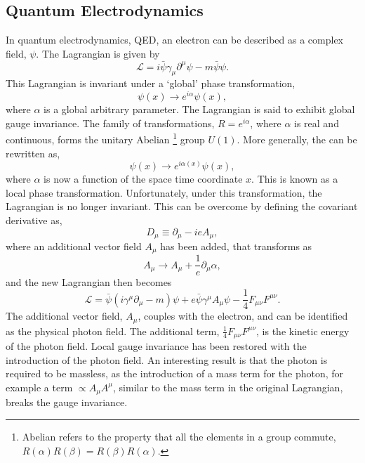 \subsection{Quantum Electrodynamics}
\label{sec:QED}
In quantum electrodynamics, QED, an electron can be described as a complex
field, $\psi$. The Lagrangian is given by
\begin{equation}
\mathcal{L} = i \bar{\psi} \gamma_{\mu} \partial^{\mu} \psi - m \bar{\psi}\psi .
\end{equation}
This Lagrangian is invariant under a `global' phase transformation,
\begin{equation}
\psi(x) \to e^{i\alpha} \psi(x),
\label{eq:global}
\end{equation}
where $\alpha$ is a global arbitrary parameter. The Lagrangian is said to exhibit
global gauge invariance. The family of transformations, $R =
e^{i \alpha}$, where $\alpha$ is real and continuous, forms the unitary
Abelian \footnote{Abelian refers to the property that all the elements in a
group commute, $R(\alpha)R(\beta) = R(\beta)R(\alpha)$.}
group $U(1)$. 
More generally, the  can be rewritten as,
\begin{equation}
\psi(x) \to e^{i\alpha(x)} \psi(x),
\label{eq:local}
\end{equation}
where $\alpha$ is now a function of the space time coordinate $x$. This is known
as a local phase transformation. Unfortunately, under this transformation, the
Lagrangian is no longer invariant. This can be overcome by defining the
covariant derivative as,
\begin{equation}
D_{\mu} \equiv \partial_{\mu} - i e A_{\mu},
\end{equation}
where an additional vector field $A_{\mu}$ has been added, that transforms as 
\begin{equation}
A_{\mu} \to A_{\mu} + \frac{1}{e} \partial_{\mu} \alpha,
\end{equation}
and the new Lagrangian then becomes
\begin{equation}
\mathcal{L} = 
\bar{\psi}(i\gamma^{\mu}\partial_{\mu} - m)\psi + 
e \bar{\psi} \gamma^{\mu} A_{\mu} \psi - 
\frac{1}{4} F_{\mu\nu} F^{\mu\nu}. 
\end{equation}
The additional vector field, $A_{\mu}$, couples with the electron,
 and can be identified as the physical photon field. The additional
term, $\frac{1}{4} F_{\mu\nu} F^{\mu\nu}$, is the kinetic energy of the photon
field. Local gauge invariance has been restored with the introduction of the photon
field. An interesting result is that the photon is required to be massless, as the introduction of
a mass term for the photon, for example a term $\propto A_{\mu}A^{\mu}$,
similar to the mass term in the original Lagrangian, breaks
the gauge invariance.

